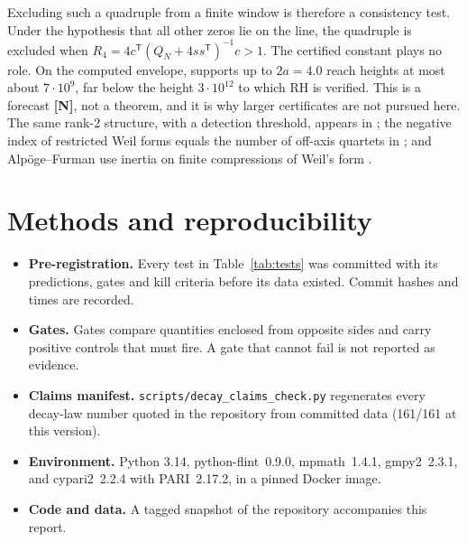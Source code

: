 \documentclass[11pt]{article}
\theoremstyle{remark}
\newcommand{\tagN}{\textbf{[N]}}
\begin{document}
Excluding such a quadruple from a finite window is therefore a consistency test. Under the hypothesis that all other zeros lie on the line, the quadruple is excluded when $R_4=4c^{\mathsf T}(Q_N+4ss^{\mathsf T})^{-1}c>1$. The certified constant plays no role. On the computed envelope, supports up to $2a=4.0$ reach heights at most about $7\cdot10^9$, far below the height $3\cdot10^{12}$ to which RH is verified. This is a forecast \tagN, not a theorem, and it is why larger certificates are not pursued here. The same rank-2 structure, with a detection threshold, appears in \cite{rhlab26}; the negative index of restricted Weil forms equals the number of off-axis quartets in \cite{kb26}; and Alpöge--Furman use inertia on finite compressions of Weil's form \cite{af26}.

\section{Methods and reproducibility}
\begin{itemize}
\item \textbf{Pre-registration.} Every test in Table~\ref{tab:tests} was committed with its predictions, gates and kill criteria before its data existed. Commit hashes and times are recorded.
\item \textbf{Gates.} Gates compare quantities enclosed from opposite sides and carry positive controls that must fire. A gate that cannot fail is not reported as evidence.
\item \textbf{Claims manifest.} \texttt{scripts/decay\_claims\_check.py} regenerates every decay-law number quoted in the repository from committed data (161/161 at this version).
\item \textbf{Environment.} Python 3.14, python-flint~0.9.0, mpmath~1.4.1, gmpy2~2.3.1, and cypari2~2.2.4 with PARI~2.17.2, in a pinned Docker image.
\item \textbf{Code and data.} A tagged snapshot of the repository accompanies this report.
\end{itemize}
\end{document}
